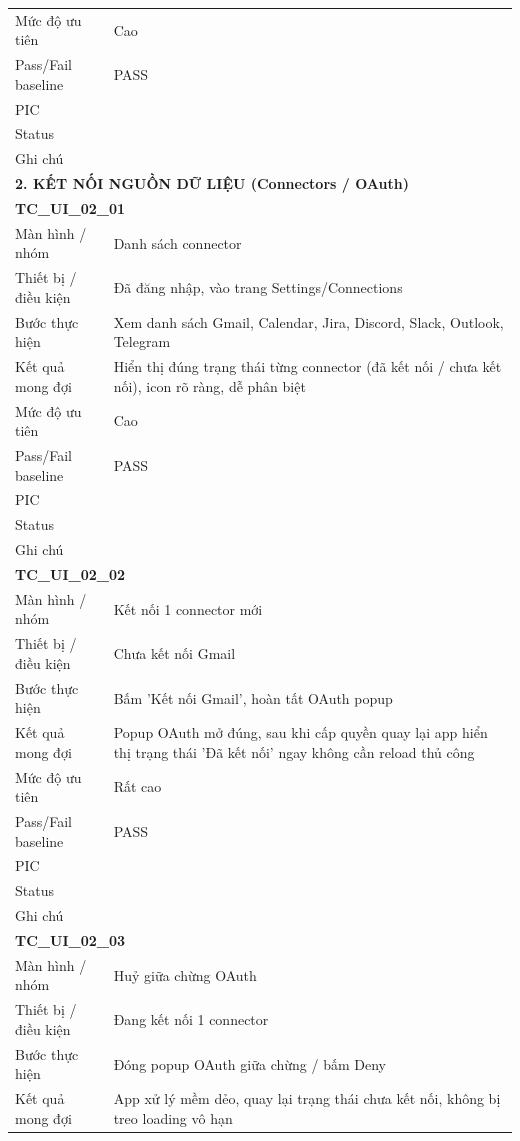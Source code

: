 \documentclass[12pt,a4paper]{article}
\begin{document}
\begin{longtable}{p{3.0cm}p{11.5cm}}
Mức độ ưu tiên & Cao \\
Pass/Fail baseline & PASS \\
PIC &  \\
Status &  \\
Ghi chú &  \\
\midrule
\multicolumn{2}{l}{\textbf{2. KẾT NỐI NGUỒN DỮ LIỆU (Connectors / OAuth)}} \\ \midrule
\multicolumn{2}{l}{\textbf{TC\_UI\_02\_01}} \\
Màn hình / nhóm & Danh sách connector \\
Thiết bị / điều kiện & Đã đăng nhập, vào trang Settings/Connections \\
Bước thực hiện & Xem danh sách Gmail, Calendar, Jira, Discord, Slack, Outlook, Telegram \\
Kết quả mong đợi & Hiển thị đúng trạng thái từng connector (đã kết nối / chưa kết nối), icon rõ ràng, dễ phân biệt \\
Mức độ ưu tiên & Cao \\
Pass/Fail baseline & PASS \\
PIC &  \\
Status &  \\
Ghi chú &  \\
\midrule
\multicolumn{2}{l}{\textbf{TC\_UI\_02\_02}} \\
Màn hình / nhóm & Kết nối 1 connector mới \\
Thiết bị / điều kiện & Chưa kết nối Gmail \\
Bước thực hiện & Bấm 'Kết nối Gmail', hoàn tất OAuth popup \\
Kết quả mong đợi & Popup OAuth mở đúng, sau khi cấp quyền quay lại app hiển thị trạng thái 'Đã kết nối' ngay không cần reload thủ công \\
Mức độ ưu tiên & Rất cao \\
Pass/Fail baseline & PASS \\
PIC &  \\
Status &  \\
Ghi chú &  \\
\midrule
\multicolumn{2}{l}{\textbf{TC\_UI\_02\_03}} \\
Màn hình / nhóm & Huỷ giữa chừng OAuth \\
Thiết bị / điều kiện & Đang kết nối 1 connector \\
Bước thực hiện & Đóng popup OAuth giữa chừng / bấm Deny \\
Kết quả mong đợi & App xử lý mềm dẻo, quay lại trạng thái chưa kết nối, không bị treo loading vô hạn \\

\end{longtable}
\end{document}
